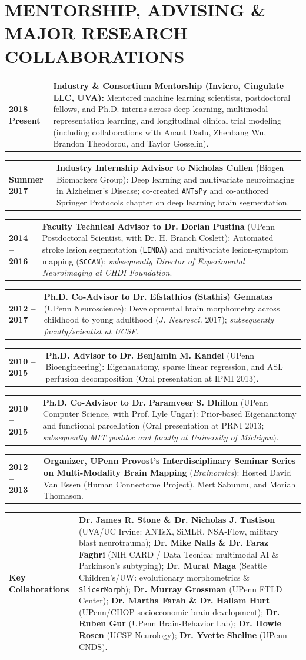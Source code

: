 \documentclass[10pt,letterpaper]{article}
\makeatletter
\newcommand{\cvline}[2]{%
  \noindent\begin{tabularx}{\textwidth}{@{} >{\raggedright\arraybackslash\bfseries\footnotesize\color{accent}}p{1.15in} >{\footnotesize\arraybackslash}X @{}}
    #1 & #2
  \end{tabularx}\par\vspace{2pt}%
}
\makeatother
\begin{document}
\section{MENTORSHIP, ADVISING \& MAJOR RESEARCH COLLABORATIONS}
\cvline{2018 -- Present}{\textbf{Industry \& Consortium Mentorship (Invicro, Cingulate LLC, UVA):} Mentored machine learning scientists, postdoctoral fellows, and Ph.D. interns across deep learning, multimodal representation learning, and longitudinal clinical trial modeling (including collaborations with Anant Dadu, Zhenbang Wu, Brandon Theodorou, and Taylor Gosselin).}
\cvline{Summer 2017}{\textbf{Industry Internship Advisor to Nicholas Cullen} (Biogen Biomarkers Group): Deep learning and multivariate neuroimaging in Alzheimer's Disease; co-created \texttt{ANTsPy} and co-authored Springer Protocols chapter on deep learning brain segmentation.}
\cvline{2014 -- 2016}{\textbf{Faculty Technical Advisor to Dr. Dorian Pustina} (UPenn Postdoctoral Scientist, with Dr. H. Branch Coslett): Automated stroke lesion segmentation (\texttt{LINDA}) and multivariate lesion-symptom mapping (\texttt{SCCAN}); \textit{subsequently Director of Experimental Neuroimaging at CHDI Foundation}.}
\cvline{2012 -- 2017}{\textbf{Ph.D. Co-Advisor to Dr. Efstathios (Stathis) Gennatas} (UPenn Neuroscience): Developmental brain morphometry across childhood to young adulthood (\textit{J. Neurosci.} 2017); \textit{subsequently faculty/scientist at UCSF}.}
\cvline{2010 -- 2015}{\textbf{Ph.D. Advisor to Dr. Benjamin M. Kandel} (UPenn Bioengineering): Eigenanatomy, sparse linear regression, and ASL perfusion decomposition (Oral presentation at IPMI 2013).}
\cvline{2010 -- 2015}{\textbf{Ph.D. Co-Advisor to Dr. Paramveer S. Dhillon} (UPenn Computer Science, with Prof. Lyle Ungar): Prior-based Eigenanatomy and functional parcellation (Oral presentation at PRNI 2013; \textit{subsequently MIT postdoc and faculty at University of Michigan}).}
\cvline{2012 -- 2013}{\textbf{Organizer, UPenn Provost's Interdisciplinary Seminar Series on Multi-Modality Brain Mapping} (\textit{Brainomics}): Hosted David Van Essen (Human Connectome Project), Mert Sabuncu, and Moriah Thomason.}
\cvline{Key Collaborations}{\textbf{Dr. James R. Stone \& Dr. Nicholas J. Tustison} (UVA/UC Irvine: ANTsX, SiMLR, NSA-Flow, military blast neurotrauma); \textbf{Dr. Mike Nalls \& Dr. Faraz Faghri} (NIH CARD / Data Tecnica: multimodal AI \& Parkinson's subtyping); \textbf{Dr. Murat Maga} (Seattle Children's/UW: evolutionary morphometrics \& \texttt{SlicerMorph}); \textbf{Dr. Murray Grossman} (UPenn FTLD Center); \textbf{Dr. Martha Farah \& Dr. Hallam Hurt} (UPenn/CHOP socioeconomic brain development); \textbf{Dr. Ruben Gur} (UPenn Brain-Behavior Lab); \textbf{Dr. Howie Rosen} (UCSF Neurology); \textbf{Dr. Yvette Sheline} (UPenn CNDS).}
\end{document}
